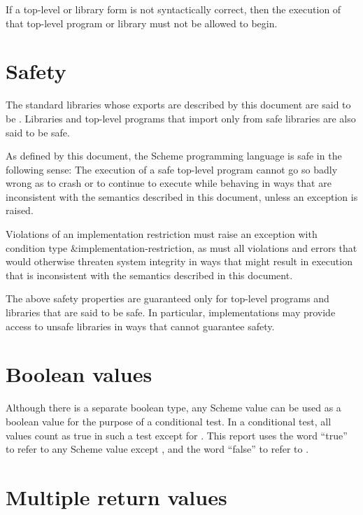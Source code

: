 If a top-level or library form is not syntactically correct, then the
execution of that top-level program or library must not be allowed to begin.

\section{Safety}
\label{safeunsafemodesection}

The standard libraries whose exports are described by this document
are said to be .  Libraries and top-level
programs that import only from safe libraries are also said to be safe.

As defined by this document, the Scheme programming language
is safe in the following sense:
The execution of a safe top-level program
cannot go so badly wrong as to crash or to continue to
execute while behaving in ways that are
inconsistent with the semantics described in this document,
unless an exception is raised.

Violations of an implementation restriction must raise an
exception with condition type {\cf\&implementation-restriction},
as must all
violations and errors that would otherwise threaten system
integrity in ways that might result in execution that is
inconsistent with the semantics described in this document.

The above safety properties are guaranteed only for top-level programs
and libraries that are said to be safe.  In particular,
implementations may provide access to unsafe libraries in ways that
cannot guarantee safety.

\section{Boolean values}
\label{booleanvaluessection}

Although there is a separate boolean type, any Scheme value can be
used as a boolean value for the purpose of a conditional test.  In a
conditional test, all values count as true in such a test except for
\schfalse{}.  This report uses the word ``true'' to refer to any
Scheme value except \schfalse{}, and the word ``false'' to refer to
\schfalse{}.  

\section{Multiple return values}
\label{multiplereturnvaluessection}

